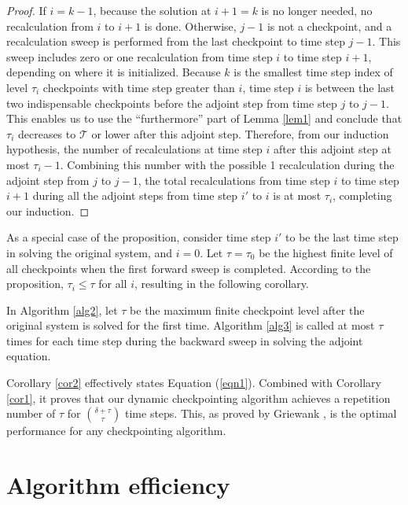 \begin{proof}
If $i = k - 1$, because the solution at $i + 1 = k$ is no longer needed, no
recalculation from $i$ to $i + 1$ is done.  Otherwise, $j - 1$ is not
a checkpoint, and a recalculation sweep is performed from the last checkpoint
to time step $j - 1$.  This sweep includes zero or one recalculation from time
step $i$ to time step $i + 1$, depending on where it is initialized.  
Because $k$ is the smallest time step index of level $\tau_i$ checkpoints with
time step greater than $i$, time step $i$ is between the last two indispensable
checkpoints before the adjoint step from time step $j$ to $j - 1$.
This enables us to use the ``furthermore'' part of Lemma \ref{lem1} and
conclude that $\tau_i$ decreases to $\mathcal{T}$ or lower after this adjoint
step.  Therefore, from our induction hypothesis, the number of recalculations
at time step $i$ after this adjoint step at most $\tau_i - 1$.  Combining this
number with the possible 1 recalculation during the adjoint step from $j$ to
$j - 1$, the total recalculations from time step $i$ to time step $i + 1$
during all the adjoint steps from time step $i'$ to $i$ is at most $\tau_i$,
completing our induction.
\end{proof}

As a special case of the proposition, consider time step $i'$ to be the last
time step in solving the original system, and $i = 0$.  Let $\tau = \tau_0$ be
the highest finite level of all checkpoints when the first forward sweep is
completed.  According to the proposition, $\tau_i \le \tau$ for all $i$,
resulting in the following corollary.

\begin{corollary} \label{cor2}
    In Algorithm \ref{alg2}, let $\tau$ be the maximum finite checkpoint level
    after the original system is solved for the first time.  Algorithm
    \ref{alg3} is called at most $\tau$ times for each time step during the
    backward sweep in solving the adjoint equation.
\end{corollary}

Corollary \ref{cor2} effectively states Equation (\ref{eqn1}).  Combined with
Corollary \ref{cor1}, it proves that our dynamic checkpointing algorithm
achieves a repetition number of $\tau$ for $\binom{\delta + \tau}{\tau}$
time steps.  This, as proved by Griewank \cite[]{griewank92}, is the optimal
performance for any checkpointing algorithm.





\section{Algorithm efficiency \label{sec_perf}}

